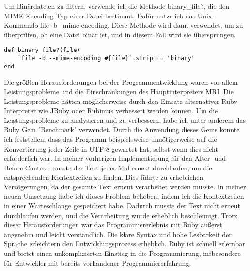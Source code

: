 \documentclass{article}
\begin{document}
Um Binärdateien zu filtern, verwende ich die Methode binary\_file?, die den MIME-Encoding-Typ einer Datei bestimmt. Dafür nutze ich das Unix-Kommando \glqq file -b --mime-encoding\grqq{}. Diese Methode wird dann verwendet, um zu überprüfen, ob eine Datei binär ist, und in diesem Fall wird sie übersprungen. 
\begin{lstlisting}
def binary_file?(file)
    `file -b --mime-encoding #{file}`.strip == 'binary'
end
\end{lstlisting}
Die größten Herausforderungen bei der Programmentwicklung waren vor allem Leistungsprobleme und die Einschränkungen des Hauptinterpreters MRI. Die Leistungsprobleme hätten möglicherweise durch den Einsatz alternativer Ruby-Interpreter wie JRuby oder Rubinius verbessert werden können.
Um die Leistungsprobleme zu analysieren und zu verbessern, habe ich unter anderem das Ruby Gem "Benchmark" verwendet. Durch die Anwendung dieses Gems konnte ich feststellen, dass das Programm beispielsweise unnötigerweise auf die Konvertierung jeder Zeile in UTF-8 gewartet hat, selbst wenn dies nicht erforderlich war.
In meiner vorherigen Implementierung für den After- und Before-Context musste der Text jedes Mal erneut durchlaufen, um die entsprechenden Kontextzeilen zu finden. Dies führte zu erheblichen Verzögerungen, da der gesamte Text erneut verarbeitet werden musste. In meiner neuen Umsetzung habe ich dieses Problem behoben, indem ich die Kontextzeilen in einer Warteschlange gespeichert habe. Dadurch musste der Text nicht erneut durchlaufen werden, und die Verarbeitung wurde erheblich beschleunigt.
Trotz dieser Herausforderungen war das Programmiererlebnis mit Ruby äußerst angenehm und leicht verständlich. Die klare Syntax und hohe Lesbarkeit der Sprache erleichtern den Entwicklungsprozess erheblich. Ruby ist schnell erlernbar und bietet einen unkomplizierten Einstieg in die Programmierung, insbesondere für Entwickler mit bereits vorhandener Programmiererfahrung.
\end{document}
